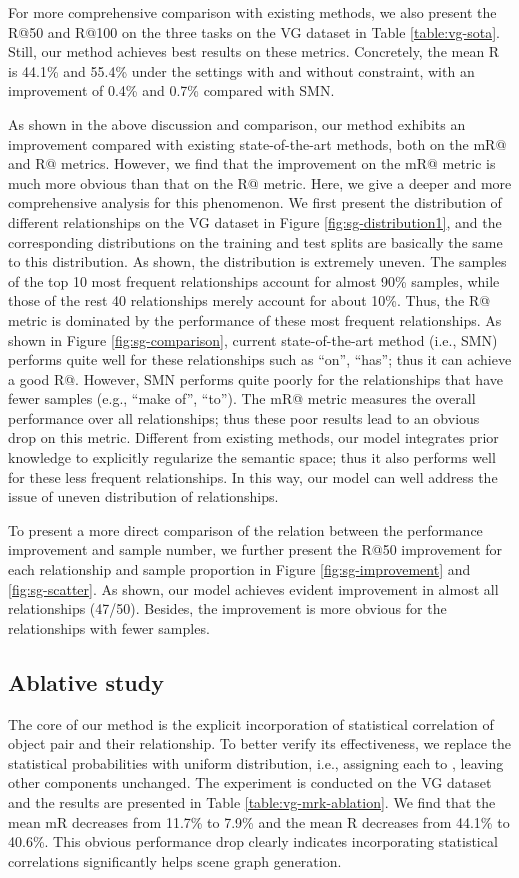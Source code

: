 \documentclass[10pt,twocolumn,letterpaper]{article}
\begin{document}
For more comprehensive comparison with existing methods, we also present the R@50 and R@100 on the three tasks on the VG dataset in Table \ref{table:vg-sota}. Still, our method achieves best results on these metrics. Concretely, the mean R is 44.1\% and 55.4\% under the settings with and without constraint, with an improvement of 0.4\% and 0.7\% compared with SMN.

As shown in the above discussion and comparison, our method exhibits an improvement compared with existing state-of-the-art methods, both on the mR@ and R@ metrics. However, we find that the improvement on the mR@ metric is much more obvious than that on the R@ metric. Here, we give a deeper and more comprehensive analysis for this phenomenon. We first present the distribution of different relationships on the VG dataset in Figure \ref{fig:sg-distribution1}, and the corresponding distributions on the training and test splits are basically the same to this distribution. As shown, the distribution is extremely uneven. The samples of the top 10 most frequent relationships account for almost 90\% samples, while those of the rest 40 relationships merely account for about 10\%. Thus, the R@ metric is dominated by the performance of these most frequent relationships. As shown in Figure \ref{fig:sg-comparison}, current state-of-the-art method (i.e., SMN) performs quite well for these relationships such as ``on'', ``has''; thus it can achieve a good R@. However, SMN performs quite poorly for the relationships that have fewer samples (e.g., ``make of'', ``to''). The mR@ metric measures the overall performance over all relationships; thus these poor results lead to an obvious drop on this metric. Different from existing methods, our model integrates prior knowledge to explicitly regularize the semantic space; thus it also performs well for these less frequent relationships. In this way, our model can well address the issue of uneven distribution of relationships.

To present a more direct comparison of the relation between the performance improvement and sample number, we further present the R@50 improvement for each relationship and sample proportion in Figure \ref{fig:sg-improvement} and \ref{fig:sg-scatter}. As shown, our model achieves evident improvement in almost all relationships (47/50). Besides, the improvement is more obvious for the relationships with fewer samples.

\subsection{Ablative study}
The core of our method is the explicit incorporation of statistical correlation of object pair and their relationship. To better verify its effectiveness, we replace the statistical probabilities with uniform distribution, i.e., assigning each  to , leaving other components unchanged. The experiment is conducted on the VG dataset and the results are presented in Table \ref{table:vg-mrk-ablation}. We find that the mean mR decreases from 11.7\% to 7.9\% and the mean R decreases from 44.1\% to 40.6\%. This obvious performance drop clearly indicates incorporating statistical correlations significantly helps scene graph generation. 
\end{document}
